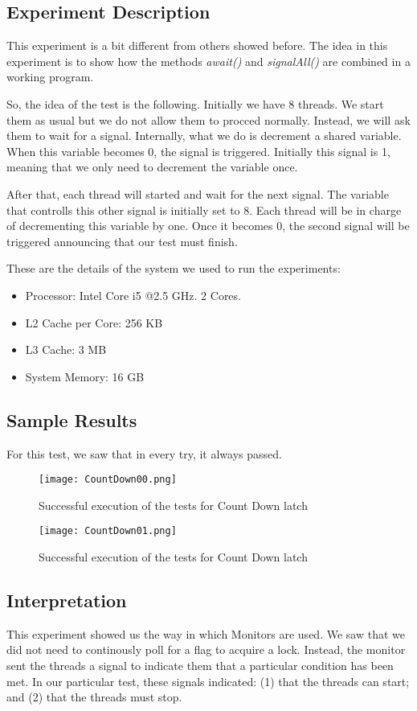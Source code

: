 \subsection{Experiment Description}
\par
This experiment is a bit different from others showed before. The idea in this experiment is to show how the methods \textit{await()} and \textit{signalAll()} are combined in a working program. 
\par
So, the idea of the test is the following. Initially we have 8 threads. We start them as usual but we do not allow them to procced normally. Instead, we will ask them to wait for a signal. Internally, what we do is decrement a shared variable. When this variable becomes 0, the signal is triggered. Initially this signal is 1, meaning that we only need to decrement the variable once.
\par
After that, each thread will started and wait for the next signal. The variable that controlls this other signal is initially set to 8. Each thread will be in charge of decrementing this variable by one. Once it becomes 0, the second signal will be triggered announcing that our test must finish.
\par
These are the details of the system we used to run the experiments:
\begin{itemize}
\item Processor: Intel Core i5 @2.5 GHz. 2 Cores.
\item L2 Cache per Core: 256 KB
\item L3 Cache: 3 MB
\item System Memory: 16 GB
\end{itemize}
\subsection{Sample Results}
\par
For this test, we saw that in every try, it always passed.
\par
\begin{figure}[h]
  \centering
  \texttt{[image: CountDown00.png]}
  \caption{Successful execution of the tests for Count Down latch}
  \label{fig:CountDown00}
\end{figure}
\par
\begin{figure}[h]
  \centering
  \texttt{[image: CountDown01.png]}
  \caption{Successful execution of the tests  for Count Down latch}
  \label{fig:CountDown01}
\end{figure}
\par
\subsection{Interpretation}
This experiment showed us the way in which Monitors are used. We saw that we did not need to continously poll for a flag to acquire a lock. Instead, the monitor sent the threads a signal to indicate them that a particular condition has been met. In our particular test, these signals indicated: (1) that the threads can start; and (2) that the threads must stop.

